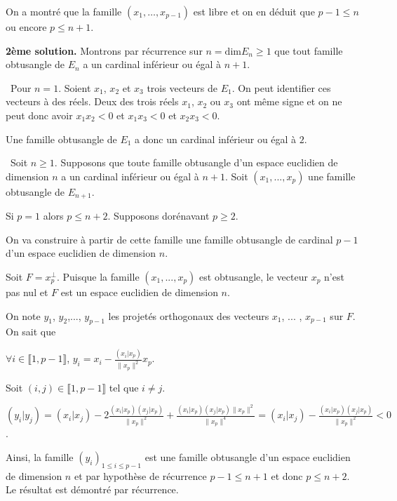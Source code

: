 {{On a montré que la famille $(x_1,\ldots,x_{p-1})$ est libre et on en déduit que $p-1\leqslant n$ ou encore $p\leqslant n+1$.

\textbf{2ème solution.} Montrons par récurrence sur $n =\text{dim}E_n\geqslant1$ que tout famille obtusangle de $E_n$ a un cardinal inférieur ou égal à $n+1$.

\textbullet~Pour $n = 1$. Soient $x_1$, $x_2$ et $x_3$ trois vecteurs de $E_1$. On peut identifier ces vecteurs à des réels. Deux des trois réels $x_1$, $x_2$ ou $x_3$ ont même signe et on ne peut donc avoir $x_1x_2 < 0$ et $x_1x_3 < 0$ et $x_2x_3 < 0$.

Une famille obtusangle de $E_1$ a donc un cardinal inférieur ou égal à $2$.

\textbullet~Soit $n\geqslant1$. Supposons que toute famille obtusangle d'un espace euclidien de dimension $n$ a un cardinal inférieur ou égal à $n+1$. Soit $(x_1,...,x_p)$ une famille obtusangle de $E_{n+1}$.

Si $p = 1$ alors $p\leqslant n+2$. Supposons dorénavant $p\geqslant2$.

On va construire à partir de cette famille une famille obtusangle de cardinal $p-1$ d'un espace euclidien de dimension $n$.

Soit $F=x_p^\bot$. Puisque la famille $(x_1,...,x_p)$ est obtusangle, le vecteur $x_p$ n'est pas nul et $F$ est un espace euclidien de dimension $n$.

On note $y_1$, $y_2$,..., $y_{p-1}$ les projetés orthogonaux des vecteurs $x_1$, ... , $x_{p-1}$ sur $F$. On sait que

\begin{center}
$\forall i\in\llbracket1,p-1\rrbracket$, $y_i =x_i -\frac{\left(x_i|x_p\right)}{\|x_p\|^2}x_p$.
\end{center}

Soit $(i,j)\in\llbracket1,p-1\rrbracket$ tel que $i\neq j$.

\begin{center}
$\left(y_i|y_j\right)=\left(x_i|x_j\right)-2\frac{\left(x_i|x_p\right)\left(x_j|x_p\right)}{\|x_p\|^2}+\frac{\left(x_i|x_p\right)\left(x_j|x_p\right)\|x_p\|^2}{\|x_p\|^4}= \left(x_i|x_j\right)-\frac{\left(x_i|x_p\right)\left(x_j|x_p\right)}{\|x_p\|^2}< 0$.
\end{center}

Ainsi, la famille $(y_i)_{1\leqslant i\leqslant p-1}$ est une famille obtusangle d'un espace euclidien de dimension $n$ et par hypothèse de récurrence $p-1\leqslant n+1$ et donc $p\leqslant n+2$. Le résultat est démontré par récurrence.
}
}
